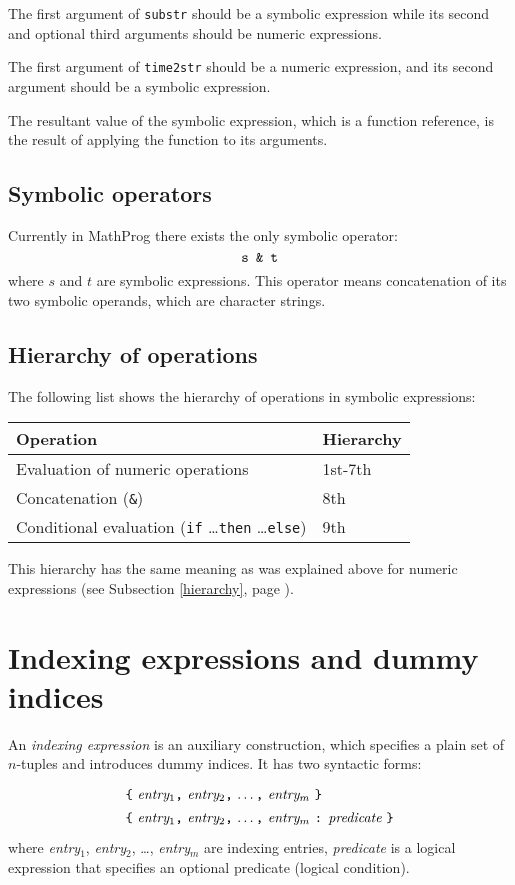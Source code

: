 \documentclass[11pt]{report}
\begin{document}
The first argument of {\tt substr} should be a symbolic expression
while its second and optional third arguments should be numeric
expressions.

The first argument of {\tt time2str} should be a numeric expression,
and its second argument should be a symbolic expression.

The resultant value of the symbolic expression, which is a function
reference, is the result of applying the function to its arguments.

\subsection{Symbolic operators}

Currently in MathProg there exists the only symbolic operator:
$$\mbox{\tt s \& t}$$
where $s$ and $t$ are symbolic expressions. This operator means
concatenation of its two symbolic operands, which are character
strings.

\subsection{Hierarchy of operations}

The following list shows the hierarchy of operations in symbolic
expressions:

\noindent\hfil
\begin{tabular}{@{}ll@{}}
Operation&Hierarchy\\
\hline
Evaluation of numeric operations&1st-7th\\
Concatenation ({\tt\&})&8th\\
Conditional evaluation ({\tt if} \dots {\tt then} \dots {\tt else})&
9th\\
\end{tabular}

This hierarchy has the same meaning as was explained above for numeric
expressions (see Subsection \ref{hierarchy}, page \pageref{hierarchy}).

\section{Indexing expressions and dummy indices}
\label{indexing}

An {\it indexing expression} is an auxiliary construction, which
specifies a plain set of $n$-tuples and introduces dummy indices. It
has two syntactic forms:
$$
{\def\arraystretch{1.4}
\begin{array}{l}
\mbox{{\tt\{} {\it entry}$_1${\tt,} {\it entry}$_2${\tt,} \dots{\tt,}
{\it entry}$_m$ {\tt\}}}\\
\mbox{{\tt\{} {\it entry}$_1${\tt,} {\it entry}$_2${\tt,} \dots{\tt,}
{\it entry}$_m$ {\tt:} {\it predicate} {\tt\}}}\\
\end{array}
}
$$
where {\it entry}{$_1$}, {\it entry}{$_2$}, \dots, {\it entry}{$_m$}
are indexing entries, {\it predicate} is a logical expression that
specifies an optional predicate (logical condition).
\end{document}
